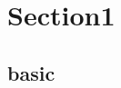 \section{Section1}
    \subsection{basic}
        

%         

%         
%              
%             
